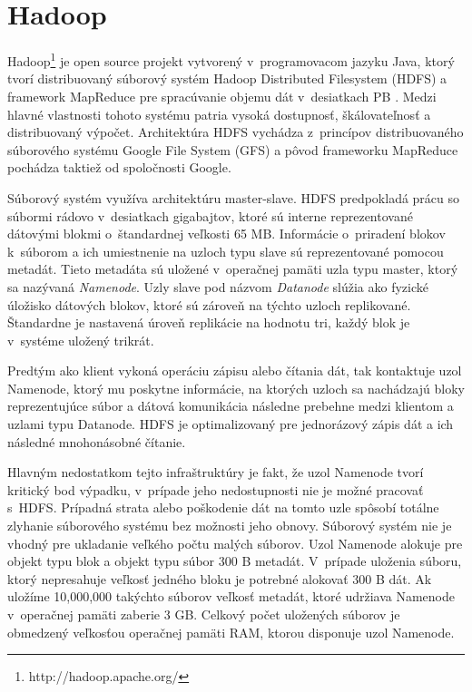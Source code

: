 \documentclass[11pt,twoside,a4paper]{book}
\begin{document}
\section*{Hadoop}

Hadoop\footnote{http://hadoop.apache.org/} je open source projekt vytvorený v~programovacom jazyku Java, ktorý tvorí distribuovaný súborový systém Hadoop Distributed Filesystem (HDFS) a framework MapReduce pre spracúvanie objemu dát v~desiatkach PB \cite{Thusoo:2010:DWA:1807167.1807278}. Medzi hlavné vlastnosti tohoto systému patria vysoká dostupnosť, škálovateľnosť a distribuovaný výpočet. Architektúra HDFS vychádza z~princípov distribuovaného súborového systému Google File System (GFS) \cite{Ghemawat:2003:GFS:945445.945450} a pôvod frameworku MapReduce \cite{Dean:2008:MSD:1327452.1327492} pochádza taktiež od spoločnosti Google.

 


Súborový systém využíva architektúru master-slave. HDFS predpokladá prácu so súbormi rádovo v~desiatkach gigabajtov, ktoré sú interne reprezentované dátovými blokmi o~štandardnej veľkosti 65 MB. Informácie o~priradení blokov k~súborom a ich umiestnenie na uzloch typu slave sú reprezentované pomocou metadát. Tieto metadáta sú uložené v~operačnej pamäti uzla typu master, ktorý sa nazývaná \emph{Namenode}. Uzly slave pod názvom \emph{Datanode} slúžia ako fyzické úložisko dátových blokov, ktoré sú zároveň na týchto uzloch replikované. Štandardne je nastavená úroveň replikácie na hodnotu tri,
každý blok je v~systéme uložený trikrát.

Predtým ako klient vykoná operáciu zápisu alebo čítania dát, tak kontaktuje uzol Namenode, ktorý mu poskytne informácie, na ktorých uzloch sa nachádzajú bloky reprezentujúce súbor a dátová komunikácia následne prebehne medzi klientom a uzlami typu Datanode. HDFS je optimalizovaný pre jednorázový zápis dát a ich následné mnohonásobné čítanie.


Hlavným nedostatkom tejto infraštruktúry je fakt, že uzol Namenode tvorí kritický bod výpadku, v~prípade jeho nedostupnosti nie je možné pracovať s~HDFS. Prípadná strata alebo poškodenie dát na tomto uzle spôsobí totálne zlyhanie súborového systému bez možnosti jeho obnovy. Súborový systém nie je vhodný pre ukladanie veľkého počtu malých súborov.
Uzol Namenode alokuje pre objekt typu blok a objekt typu súbor 300 B metadát. V~prípade uloženia súboru, ktorý nepresahuje veľkosť jedného bloku je potrebné alokovať 300 B dát. Ak uložíme 10,000,000 takýchto súborov veľkosť metadát, ktoré udržiava Namenode v~operačnej pamäti zaberie 3 GB. Celkový počet uložených súborov je obmedzený veľkosťou operačnej pamäti RAM, ktorou disponuje uzol Namenode.
\end{document}
